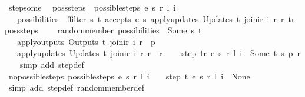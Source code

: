 \begin{isabellebody}
\isanewline
{}\isamarkupfalse%
\ step{\isacharunderscore}some{\isacharcolon}\isanewline
\ \ {\isachardoublequoteopen}poss{\isacharunderscore}steps\ {\isacharequal}\ {\isacharparenleft}possible{\isacharunderscore}steps\ e\ s\ r\ l\ i{\isacharparenright}\ {\isasymLongrightarrow}\isanewline
\ \ \ possibilities\ {\isacharequal}\ ffilter\ {\isacharparenleft}{\isasymlambda}{\isacharparenleft}s{\isacharprime}{\isacharcomma}\ t{\isacharparenright}{\isachardot}\ accepts\ e\ s{\isacharprime}\ {\isacharparenleft}apply{\isacharunderscore}updates\ {\isacharparenleft}Updates\ t{\isacharparenright}\ {\isacharparenleft}join{\isacharunderscore}ir\ i\ r{\isacharparenright}\ r{\isacharparenright}\ tr{\isacharparenright}\ poss{\isacharunderscore}steps\ {\isasymLongrightarrow}\isanewline
\ \ \ random{\isacharunderscore}member\ possibilities\ {\isacharequal}\ Some\ {\isacharparenleft}s{\isacharprime}{\isacharcomma}\ t{\isacharparenright}\ {\isasymLongrightarrow}\isanewline
\ \ \ apply{\isacharunderscore}outputs\ {\isacharparenleft}Outputs\ t{\isacharparenright}\ {\isacharparenleft}join{\isacharunderscore}ir\ i\ r{\isacharparenright}\ {\isacharequal}\ p\ {\isasymLongrightarrow}\isanewline
\ \ \ apply{\isacharunderscore}updates\ {\isacharparenleft}Updates\ t{\isacharparenright}\ {\isacharparenleft}join{\isacharunderscore}ir\ i\ r{\isacharparenright}\ r\ {\isacharequal}\ r{\isacharprime}\ {\isasymLongrightarrow}\isanewline
\ \ \ step\ tr\ e\ s\ r\ l\ i\ {\isacharequal}\ Some\ {\isacharparenleft}t{\isacharcomma}\ s{\isacharprime}{\isacharcomma}\ p{\isacharcomma}\ r{\isacharprime}{\isacharparenright}{\isachardoublequoteclose}\isanewline
%
\isadelimproof
\ \ %
\endisadelimproof
%
\isatagproof
{}\isamarkupfalse%
\ {\isacharparenleft}simp\ add{\isacharcolon}\ step{\isacharunderscore}def{\isacharparenright}%
\endisatagproof
{\isafoldproof}%
%
\isadelimproof
\isanewline
%
\endisadelimproof
\isanewline
{}\isamarkupfalse%
\ no{\isacharunderscore}possible{\isacharunderscore}steps{\isacharunderscore}{}{\isacharcolon}\ {\isachardoublequoteopen}possible{\isacharunderscore}steps\ e\ s\ r\ l\ i\ {\isacharequal}\ {\isacharbraceleft}{\isacharbar}{\isacharbar}{\isacharbraceright}\ {\isasymLongrightarrow}\ step\ t\ e\ s\ r\ l\ i\ {\isacharequal}\ None{\isachardoublequoteclose}\isanewline
%
\isadelimproof
\ \ %
\endisadelimproof
%
\isatagproof
{}\isamarkupfalse%
\ {\isacharparenleft}simp\ add{\isacharcolon}\ step{\isacharunderscore}def\ random{\isacharunderscore}member{\isacharunderscore}def{\isacharparenright}%
\endisatagproof
{\isafoldproof}%

\end{isabellebody}
